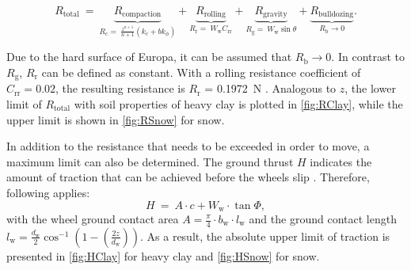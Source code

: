 \begin{equation}
 	R_{\text{total}} \:  = \: 
 	\underbrace{R_\text{compaction}}_{R_\text{c} = \: \frac{z^{n+1}}{n+1} \left( k_\text{c} + b  k_\phi \right)} + 
 	\underbrace{R_\text{rolling}}_{R_\text{r} = \: W_\text{w}  C_\text{rr}} +  
 	\underbrace{R_\text{gravity}}_{R_\text{g} = \: W_\text{w}  \sin \theta} +
 	\underbrace{R_\text{bulldozing}}_{R_\text{b} \rightarrow 0}. 	
 	\label{eq:Resistance}
 \end{equation} 

Due to the hard surface of Europa, it can be assumed that \( R_\text{b} \rightarrow 0\). In contrast to \( R_\text{g} \), \( R_\text{r}\) can be defined as constant. With a rolling resistance coefficient of \( C_\text{rr} = 0.02\), the resulting resistance is \( R_\text{r}\) = 0.1972~N \cite{rollingCoefficient}. Analogous to \(z\), the lower limit of \(R_{\text{total}}\) with soil properties of heavy clay is plotted in \autoref{fig:RClay}, while the upper limit is shown in \autoref{fig:RSnow} for snow.

In addition to the resistance that needs to be exceeded in order to move, a maximum limit can also be determined. The ground thrust \(H\) indicates the amount of traction that can be achieved before the wheels slip \cite{Parameters}.  Therefore, following applies:
\begin{equation}
	H \:  = \: A \cdot c + W_\text{w} \cdot \tan \Phi , 
	\label{eq:}
\end{equation}
 with the wheel ground contact area \(A = \frac{\pi}{4} \cdot b_\text{w} \cdot l_\text{w}\) and the ground contact length \(l_\text{w}=\frac{d_\text{w}}{2}\cos^{-1}\left(1 - \left( \frac{2z}{d_\text{w}} \right) \right)\). As a result, the absolute upper limit of traction is presented in \autoref{fig:HClay} for heavy clay and \autoref{fig:HSnow} for snow. 
 

